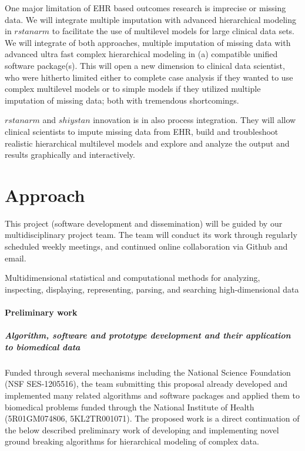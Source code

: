 \documentclass[11pt,notitlepage]{article}
\begin{document}
One major limitation of EHR based outcomes research is imprecise or missing data. We will integrate multiple imputation with advanced hierarchical modeling in $rstanarm$ to facilitate the use of multilevel models for large clinical data sets. We will integrate of both approaches, multiple imputation of missing data with advanced ultra fast complex hierarchical modeling in (a) compatible unified software package(s). This will open a new dimension to clinical data scientist, who were hitherto limited either to complete case analysis if they wanted to use complex multilevel models or to simple models if they utilized multiple imputation of missing data; both with tremendous shortcomings. 

$rstanarm$ and $shiystan$ innovation is in also process integration. They will allow clinical scientists to impute missing data from EHR, build and troubleshoot realistic hierarchical multilevel models and explore and analyze the output and results graphically and interactively. 

\part*{Approach}
This project (software development and dissemination) will be guided by our multidisciplinary project team. The team will conduct its work through regularly scheduled weekly meetings, and continued online collaboration via Github and email. 

Multidimensional statistical and computational methods for analyzing, inspecting, displaying, representing, parsing, and searching high-dimensional data

\subsection*{Preliminary work}

\subsubsection*{Algorithm, software and prototype development and their application to biomedical data}
Funded through several mechanisms including the National Science Foundation (NSF SES-1205516), the team submitting this proposal already developed and implemented many related algorithms and software packages and applied them to biomedical problems funded through the National Institute of Health (5R01GM074806, 5KL2TR001071). The proposed work is a direct continuation of the below described preliminary work of developing and implementing novel ground breaking algorithms for hierarchical modeling of complex data.
\end{document}

